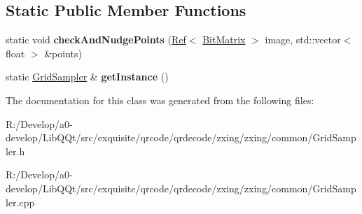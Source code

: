 \subsection*{Static Public Member Functions}
\begin{DoxyCompactItemize}
\item 
\mbox{\label{classzxing_1_1_grid_sampler_af284c1714f22a9bbcf8305b0c54811aa}} 
static void {\bfseries check\+And\+Nudge\+Points} (\mbox{\hyperlink{classzxing_1_1_ref}{Ref}}$<$ \mbox{\hyperlink{classzxing_1_1_bit_matrix}{Bit\+Matrix}} $>$ image, std\+::vector$<$ float $>$ \&points)
\item 
\mbox{\label{classzxing_1_1_grid_sampler_a03c639a778beacc4bf3e9a786398abda}} 
static \mbox{\hyperlink{classzxing_1_1_grid_sampler}{Grid\+Sampler}} \& {\bfseries get\+Instance} ()
\end{DoxyCompactItemize}


The documentation for this class was generated from the following files\+:\begin{DoxyCompactItemize}
\item 
R\+:/\+Develop/a0-\/develop/\+Lib\+Q\+Qt/src/exquisite/qrcode/qrdecode/zxing/zxing/common/Grid\+Sampler.\+h\item 
R\+:/\+Develop/a0-\/develop/\+Lib\+Q\+Qt/src/exquisite/qrcode/qrdecode/zxing/zxing/common/Grid\+Sampler.\+cpp\end{DoxyCompactItemize}
